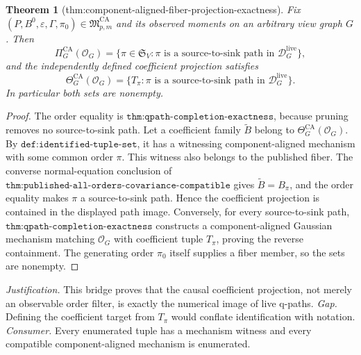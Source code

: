 \documentclass{article}
\newtheorem{theorem}{Theorem}
\begin{document}
\begin{theorem}[thm:component-aligned-fiber-projection-exactness]\label{thm:component-aligned-fiber-projection-exactness}
Fix \((P,B^0,\varepsilon,\Gamma,\pi_0)\in\mathfrak M_{p,m}^{\mathrm{CA}}\) and its observed moments on an arbitrary view graph \(G\).  Then
\[
 \Pi_G^{\mathrm{CA}}(\mathcal O_G)
 =\{\pi\in\mathfrak S_V:\pi\text{ is a source-to-sink path in }
 \mathcal D_G^{\mathrm{live}}\},
\]
and the independently defined coefficient projection satisfies
\[
 \Theta_G^{\mathrm{CA}}(\mathcal O_G)
 =\{T_\pi:\pi\text{ is a source-to-sink path in }
 \mathcal D_G^{\mathrm{live}}\}.
\]
In particular both sets are nonempty.
\end{theorem}
\begin{proof}
The order equality is \(\texttt{thm:qpath-completion-exactness}\), because pruning removes no source-to-sink path.  Let a coefficient family \(\widetilde B\) belong to \(\Theta_G^{\mathrm{CA}}(\mathcal O_G)\).  By \(\texttt{def:identified-tuple-set}\), it has a witnessing component-aligned mechanism with some common order \(\pi\).  This witness also belongs to the published fiber.  The converse normal-equation conclusion of \(\texttt{thm:published-all-orders-covariance-compatible}\) gives \(\widetilde B=B_\pi\), and the order equality makes \(\pi\) a source-to-sink path.  Hence the coefficient projection is contained in the displayed path image.  Conversely, for every source-to-sink path, \(\texttt{thm:qpath-completion-exactness}\) constructs a component-aligned Gaussian mechanism matching \(\mathcal O_G\) with coefficient tuple \(T_\pi\), proving the reverse containment.  The generating order \(\pi_0\) itself supplies a fiber member, so the sets are nonempty.
\end{proof}
\par\smallskip\noindent \textit{Justification.} This bridge proves that the causal coefficient projection, not merely an observable order filter, is exactly the numerical image of live q-paths. \textit{Gap.} Defining the coefficient target from \(T_\pi\) would conflate identification with notation. \textit{Consumer.} Every enumerated tuple has a mechanism witness and every compatible component-aligned mechanism is enumerated.
\end{document}
